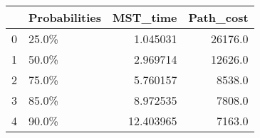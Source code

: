 \begin{tabular}{llrr}
\toprule
{} & Probabilities &   MST\_time &  Path\_cost \\
\midrule
0 &         25.0\% &   1.045031 &    26176.0 \\
1 &         50.0\% &   2.969714 &    12626.0 \\
2 &         75.0\% &   5.760157 &     8538.0 \\
3 &         85.0\% &   8.972535 &     7808.0 \\
4 &         90.0\% &  12.403965 &     7163.0 \\
\bottomrule
\end{tabular}
